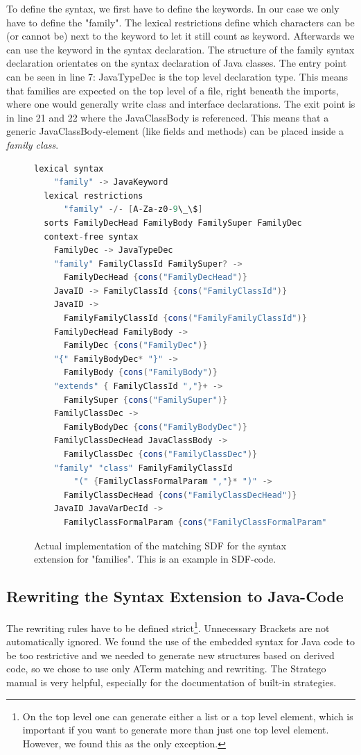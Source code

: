 \documentclass{report}
\begin{document}
To define the syntax, we first have to define the keywords. In our case we only have to define the "family". The lexical restrictions define which characters can be (or cannot be) next to the keyword to let it still count as keyword. Afterwards we can use the keyword in the syntax declaration. The structure of the family syntax declaration orientates on the syntax declaration of Java classes. The entry point can be seen in line 7: JavaTypeDec is the top level declaration type. This means that families are expected on the top level of a file, right beneath the imports, where one would generally write class and interface declarations. The exit point is in line 21 and 22 where the JavaClassBody is referenced. This means that a generic JavaClassBody-element (like fields and methods) can be placed inside a \emph{family class}.

\begin{figure}[H]
\begin{lstlisting}[language=java,breaklines=false]
  lexical syntax
    "family" -> JavaKeyword
  lexical restrictions
  	  "family" -/- [A-Za-z0-9\_\$] 
  sorts FamilyDecHead FamilyBody FamilySuper FamilyDec
  context-free syntax
    FamilyDec -> JavaTypeDec
    "family" FamilyClassId FamilySuper? ->
      FamilyDecHead {cons("FamilyDecHead")}
    JavaID -> FamilyClassId {cons("FamilyClassId")}
    JavaID -> 
      FamilyFamilyClassId {cons("FamilyFamilyClassId")}
    FamilyDecHead FamilyBody ->
      FamilyDec {cons("FamilyDec")}
    "{" FamilyBodyDec* "}" ->
      FamilyBody {cons("FamilyBody")}
    "extends" { FamilyClassId ","}+ ->
      FamilySuper {cons("FamilySuper")}
    FamilyClassDec ->
      FamilyBodyDec {cons("FamilyBodyDec")}
    FamilyClassDecHead JavaClassBody ->
      FamilyClassDec {cons("FamilyClassDec")}
    "family" "class" FamilyFamilyClassId
        "(" {FamilyClassFormalParam ","}* ")" ->
      FamilyClassDecHead {cons("FamilyClassDecHead")}
    JavaID JavaVarDecId ->
      FamilyClassFormalParam {cons("FamilyClassFormalParam")}
\end{lstlisting}
\caption{Actual implementation of the matching SDF for the syntax extension for "families". This is an example in SDF-code.}
\label{sdfFamilies}
\end{figure}


\subsection{Rewriting the Syntax Extension to Java-Code}
The rewriting rules have to be defined strict\footnote{On the top level one can generate either a list or a top level element, which is important if you want to generate more than just one top level element. However, we found this as the only exception.}. Unnecessary Brackets are not automatically ignored. We found the use of the embedded syntax for Java code to be too restrictive and we needed to generate new structures based on derived code, so we chose to use only ATerm matching and rewriting. The Stratego manual \cite{Stratego-Manual} is very helpful, especially for the documentation of built-in strategies.
\end{document}
